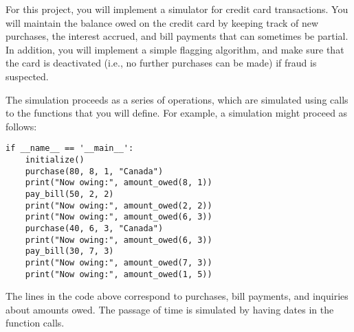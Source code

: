 \documentclass[11pt]{article}
\begin{document}
\newpage
{}

\noindent

For this project, you will implement a simulator for credit card transactions. You will maintain the  balance owed on the credit card by keeping track of  new purchases, the interest accrued, and bill payments that can sometimes be partial. In addition, you will implement a simple flagging algorithm, and make sure that the card is deactivated (i.e., no further purchases can be made) if fraud is suspected.

The simulation proceeds as a series of operations, which are simulated using calls to the functions that you will define. For example, a simulation might proceed as follows:

\begin{verbatim}
if __name__ == '__main__':
    initialize()
    purchase(80, 8, 1, "Canada")
    print("Now owing:", amount_owed(8, 1))
    pay_bill(50, 2, 2)
    print("Now owing:", amount_owed(2, 2))
    print("Now owing:", amount_owed(6, 3))
    purchase(40, 6, 3, "Canada")
    print("Now owing:", amount_owed(6, 3))
    pay_bill(30, 7, 3)
    print("Now owing:", amount_owed(7, 3))
    print("Now owing:", amount_owed(1, 5))
\end{verbatim}

The lines in the code above correspond to purchases, bill payments, and inquiries about amounts owed. The passage of time is simulated by having dates in the function calls.
\end{document}
